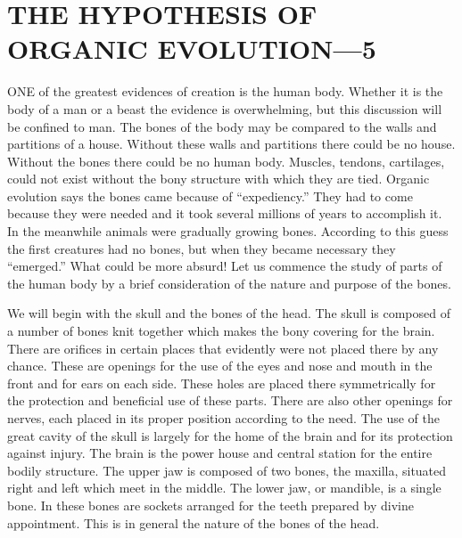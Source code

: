 \chapter{THE HYPOTHESIS OF ORGANIC EVOLUTION—5}

ONE of the greatest evidences of creation is the human body. Whether it is the body of a
man or a beast the evidence is overwhelming, but this discussion will be confined to man.
The bones of the body may be compared to the walls and partitions of a house. Without these
walls and partitions there could be no house. Without the bones there could be no human
body. Muscles, tendons, cartilages, could not exist without the bony structure with which
they are tied. Organic evolution says the bones came because of ``expediency.'' They had to
come because they were needed and it took several millions of years to accomplish it. In the
meanwhile animals were gradually growing bones. According to this guess the first creatures
had no bones, but when they became necessary they ``emerged.'' What could be more absurd!
Let us commence the study of parts of the human body by a brief consideration of the nature
and purpose of the bones.

We will begin with the skull and the bones of the head. The skull is composed of a number of
bones knit together which makes the bony covering for the brain. There are orifices in certain
places that evidently were not placed there by any chance. These are openings for the use of
the eyes and nose and mouth in the front and for ears on each side. These holes are placed
there symmetrically for the protection and beneficial use of these parts. There are also other
openings for nerves, each placed in its proper position according to the need. The use of the
great cavity of the skull is largely for the home of the brain and for its protection against
injury. The brain is the power house and central station for the entire bodily structure. The
upper jaw is composed of two bones, the maxilla, situated right and left which meet in the
middle. The lower jaw, or mandible, is a single bone. In these bones are sockets arranged for
the teeth prepared by divine appointment. This is in general the nature of the bones of the
head.

